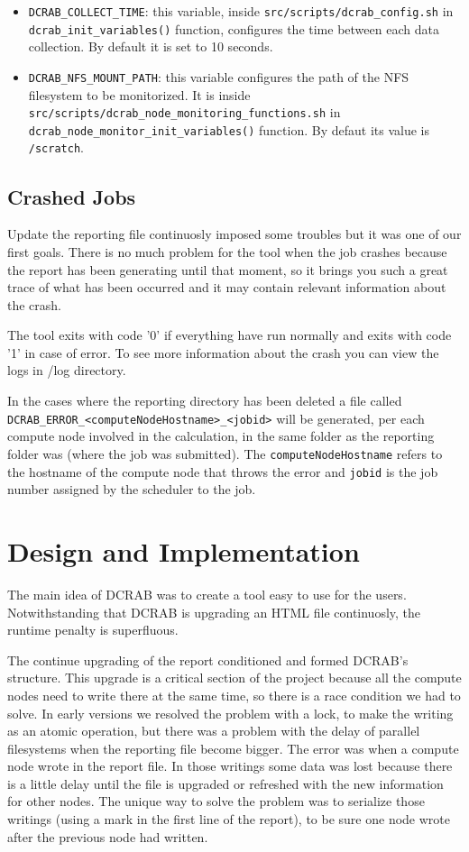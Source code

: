 \documentclass[10pt,a4paper]{report}
\begin{document}
\begin{itemize}
	\item \texttt{DCRAB\_COLLECT\_TIME}: this variable, inside \verb+src/scripts/dcrab_config.sh+ in \texttt{dcrab\_init\_variables()} function, configures the time between each data collection. By default it is set to 10 seconds.
	\item \texttt{DCRAB\_NFS\_MOUNT\_PATH}: this variable configures the path of the NFS filesystem to be monitorized. It is inside \verb+src/scripts/dcrab_node_monitoring_functions.sh+ in \texttt{dcrab\_node\_monitor\_init\_variables()} function. By defaut its value is \verb+/scratch+.
\end{itemize}

\section{Crashed Jobs}
\label{crash}
Update the reporting file continuosly imposed some troubles but it was one of our first goals. There is no much problem for the tool when the job crashes because the report has been generating until that moment, so it brings you such a great trace of what has been occurred and it may contain relevant information about the crash.

The tool exits with code '0' if everything have run normally and exits with code '1' in case of error. To see more information about the crash you can view the logs in /log directory.

In the cases where the reporting directory has been deleted a file called \verb+DCRAB_ERROR_<computeNodeHostname>_<jobid>+ will be generated, per each compute node involved in the calculation, in the same folder as the reporting folder was (where the job was submitted). The \verb+computeNodeHostname+ refers to the hostname of the compute node that throws the error and \verb+jobid+ is the job number assigned by the scheduler to the job.

\chapter{Design and Implementation}

The main idea of DCRAB was to create a tool easy to use for the users. Notwithstanding that DCRAB is upgrading an HTML file continuosly, the runtime penalty is superfluous.

The continue upgrading of the report conditioned and formed DCRAB's structure. This upgrade is a critical section of the project because all the compute nodes need to write there at the same time, so there is a race condition we had to solve. In early versions we resolved the problem with a lock, to make the writing as an atomic operation, but there was a problem with the delay of parallel filesystems when the reporting file become bigger. The error was when a compute node wrote in the report file. In those writings some data was lost because there is a little delay until the file is upgraded or refreshed with the new information for other nodes. The unique way to solve the problem was to serialize those writings (using a mark in the first line of the report), to be sure one node wrote after the previous node had written.
\end{document}
